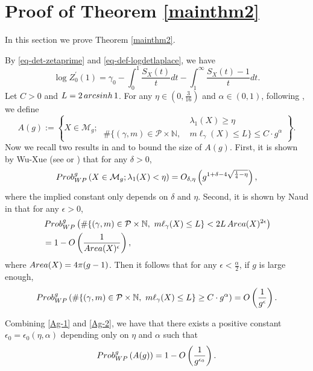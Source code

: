 \documentclass[11pt]{amsart}
\newcommand{\sM}{\mathcal{M}}
\newcommand{\eps}{\epsilon}
\def\area{\mathop{\rm Area}}
\def\arcsinh{\mathop{\rm arcsinh}}
\def\Prob{\mathop{\rm Prob}\nolimits_{\rm WP}^g}
\theoremstyle{plain}
\newcommand{\be}{\begin{equation}}
\newcommand{\ene}{\end{equation}}
\theoremstyle{definition}
\theoremstyle{remark}
\begin{document}
\section{Proof of Theorem \ref{mainthm2}}\label{s-mt2}

In this section we prove Theorem \ref{mainthm2}.

By \eqref{eq-det-zetaprime} and \eqref{eq-def-logdetlaplace}, we have 
\be\label{e-z0-1}
\log Z_0^\prime(1)=\gamma_0-\int_0^1\frac{S_X(t)}{t}dt-\int_1^\infty\frac{S_X(t)-1}{t}dt.
\ene
Let $C>0$ and $L=2\arcsinh 1$. 
For any $ \eta\in (0, \frac{3}{16}) $ and $\alpha \in (0,1)$, following \cite{naud2023determinants}, we define 
\be
A(g):=\left\{X\in \sM_g;\ \begin{aligned}
		&\lambda_1(X)\geq \eta \\
		\#\{(\gamma,m)\in \mathcal{P}\times \mathbb{N},\ & m\ell_\gamma(X)\leq L\}\leq C\cdot g^\alpha
	\end{aligned}\right\}.
\ene
Now we recall two results in \cite{wu2022random} and \cite{naud2023determinants} to bound the size of $A(g)$. First, it is shown by Wu-Xue (see \cite[Subsection 7.3]{wu2022random} or \cite[Theorem 29]{WX22pgt}) that for any $\delta>0$,
\begin{equation}\label{Ag-1}
    \Prob\left(X\in \sM_g; \lambda_1(X)< \eta \right)=O_{\delta,\eta}\left(g^{1+\delta-4\sqrt{\frac{1}{4}-\eta}}\right),
\end{equation}
where the implied constant only depends on $\delta$ and $\eta$. Second, it is shown by Naud in \cite[Section 4.3]  {naud2023determinants} that for any $\epsilon>0$,
\[
\begin{aligned}
&\Prob\left(    \#\{(\gamma,m)\in \mathcal{P}\times \mathbb{N},\  m\ell_\gamma(X)\leq L\} <2L\area(X)^{2\epsilon}   \right)\\
&=1-O\left(\frac{1}{\area(X)^{\epsilon}}\right),
\end{aligned}
\]
where $\area(X)=4\pi(g-1)$. Then it follows that for any $\epsilon<\frac{\alpha}{2}$, if  $g$  is 
large enough,
\begin{equation}\label{Ag-2}
    \Prob\left(    \#\{(\gamma,m)\in \mathcal{P}\times \mathbb{N},\  m\ell_\gamma(X)\leq L\} \geq C\cdot g^\alpha \right)=O\left(\frac{1}{g^{\epsilon}}\right).
\end{equation}

\noindent Combining \eqref{Ag-1} and \eqref{Ag-2},  we have that there exists a positive constant $\epsilon_0=\eps_0(\eta,\alpha)$ depending only on $\eta$ and $\alpha$ such that
\be\label{e-l-1}
\Prob\left(A(g)\right)=1-O\left(\frac{1}{g^{\epsilon_0}}\right).
\ene 
\end{document}
